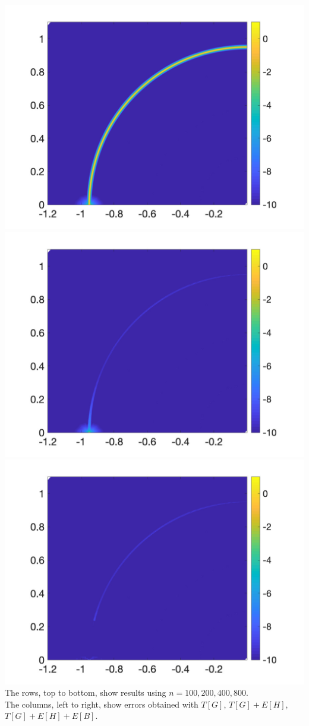 \includegraphics[trim=40 20 40 10, clip, width=2.5truein]{figs/fig800a3} 
\includegraphics[trim=40 20 40 10, clip, width=2.5truein]{figs/fig800b3} 
\includegraphics[trim=40 20 40 10, clip, width=2.5truein]{figs/fig800c3} 
\vfill
\noindent
The rows, top to bottom, show results using $n=100,200,400,800$.\\
The columns, left to right, show errors obtained with $T[G]$, $T[G]+E[H]$, $T[G]+E[H]+E[B]$.

